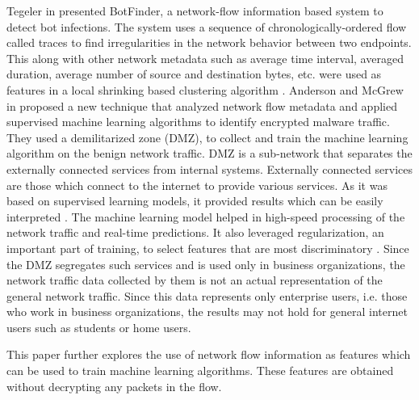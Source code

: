 Tegeler \etal in \cite{TegelerFVK12} presented BotFinder, a network-flow information based system to detect bot infections. The system uses a sequence of chronologically-ordered flow called traces to find irregularities in the network behavior between two endpoints. This along with other network metadata such as average time interval, averaged duration, average number of source and destination bytes, etc. were used as features in a local shrinking based clustering algorithm \cite{WangQZ07}. Anderson and McGrew in \cite{AndersonM17} proposed a new technique that analyzed network flow metadata and applied supervised machine learning algorithms to identify encrypted malware traffic. They used a demilitarized zone (DMZ), to collect and train the machine learning algorithm on the benign network traffic. DMZ is a sub-network that separates the externally connected services from internal systems. Externally connected services are those which connect to the internet to provide various services. As it was based on supervised learning models, it provided results which can be easily interpreted \cite{SommerP10}. The machine learning model helped in high-speed processing of the network traffic and real-time predictions. It also leveraged regularization, an important part of training, to select features that are most discriminatory \cite{HastieTF09}. Since the DMZ segregates such services and is used only in business organizations, the network traffic data collected by them is not an actual representation of the general network traffic. Since this data represents only enterprise users, i.e. those who work in business organizations, the results may not hold for general internet users such as students or home users.

This paper further explores the use of network flow information as features which can be used to train machine learning algorithms. These features are obtained without decrypting any packets in the flow.
